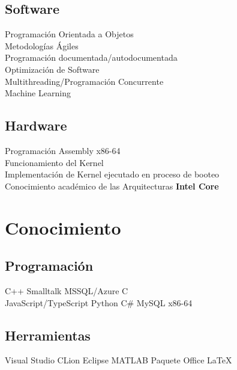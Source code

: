 \documentclass[letterpaper]{deedy-resume} %
\begin{document}
\begin{minipage}[t]{0.42\textwidth}

\subsection{Software}

\textbullet{}Programación Orientada a Objetos \\
\textbullet{}Metodologías Ágiles \\
\textbullet{}Programación documentada/autodocumentada \\
\textbullet{}Optimización de Software \\
\textbullet{}Multithreading/Programación Concurrente \\
\textbullet{}Machine Learning \\
\sectionspace
\subsection{Hardware}
\textbullet{}Programación Assembly x86-64 \\
\textbullet{}Funcionamiento del Kernel \\
\textbullet{}Implementación de Kernel ejecutado en proceso de booteo \\
\textbullet{}Conocimiento académico de las Arquitecturas \textbf{Intel Core}


\sectionspace %


\section{Conocimiento}

\subsection{Programación}

C++ \textbullet{} Smalltalk \textbullet{} MSSQL/Azure \textbullet{} C \\
JavaScript/TypeScript \textbullet{} Python \textbullet{} C\# \textbullet{} MySQL \textbullet{} x86-64\\
\sectionspace

\subsection{Herramientas}
Visual Studio \textbullet{} CLion \textbullet{} Eclipse \textbullet{} MATLAB \textbullet{} Paquete Office \textbullet{} \LaTeX


\end{minipage}
\end{document}
